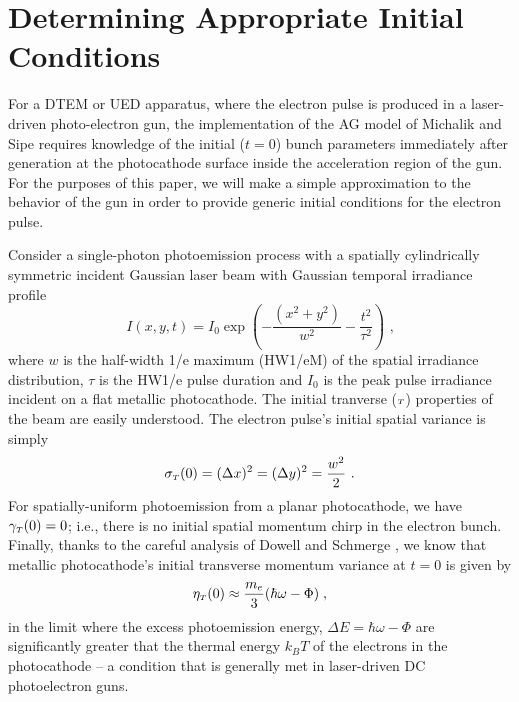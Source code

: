 
\section{Determining Appropriate Initial Conditions} \label{sec:initial_conditions}
For a DTEM or UED apparatus, where the electron pulse is produced in a laser-driven photo-electron gun, the implementation of the AG model of Michalik and Sipe \cite{michalik_analytic_2006} requires knowledge of the initial ($ t = 0 $) bunch parameters immediately after generation at the photocathode surface inside the acceleration region of the gun.
For the purposes of this paper, we will make a simple approximation to the behavior of the gun in order to provide generic initial conditions for the electron pulse.

Consider a single-photon photoemission process with a spatially cylindrically symmetric incident Gaussian laser beam with Gaussian temporal irradiance profile 
\begin{equation}\label{eq:laser_form}
I ( x , y , t ) = I_{0} \exp \left ( - \frac{ ( x^{2} +y^{2} ) }{ w^{2} } - \frac{ t^{ 2 } }{ \tau^{ 2 } } \right ) \text{ ,}
\end{equation}
where $w$ is the half-width 1/e maximum (HW1/eM) of the spatial irradiance distribution, $\tau$ is the HW1/e pulse duration and $I_{0}$ is the peak pulse irradiance incident on a flat metallic photocathode.
The initial tranverse (${\scriptscriptstyle T}$) properties of the beam are easily understood.
The electron pulse's initial spatial variance is simply
\begin{equation}
\sigma_{{\scriptscriptstyle T} } ( 0 ) = ( \Delta x )^{2} = ( \Delta y)^{2} = \frac{ w^{2} }{ 2 } \text{ .}
\end{equation}
For spatially-uniform photoemission from a planar photocathode, we have $ \gamma_{{\scriptscriptstyle T}} ( 0 ) = 0 $; i.e., there is no initial spatial momentum chirp in the electron bunch.
Finally, thanks to the careful analysis of Dowell and Schmerge \cite{dowell_quantum_2009}, we know that metallic photocathode's initial transverse momentum variance at $ t = 0 $ is given by
\begin{equation} \label{eq:jensen_eta}
  \eta_{ {\scriptscriptstyle T} } ( 0 ) \approx \frac{ m_{e} }{ 3 } ( \hbar \omega - \Phi ) \; \text{,}
\end{equation}
in the limit where the excess photoemission energy, $ \Delta E = \hbar \omega - \Phi $ are significantly greater that the thermal energy $ k_{B} T $ of the electrons in the photocathode -- a condition that is generally met in laser-driven DC photoelectron guns.

